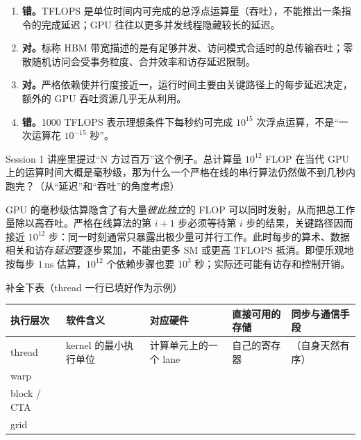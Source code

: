 \documentclass[11pt,a4paper,fontset=none]{ctexart}
\begin{document}
\begin{answer}
\begin{enumerate}[label=(\alph*)]
  \item \textbf{错。}TFLOPS 是单位时间内可完成的总浮点运算量（吞吐），不能推出一条指令的完成延迟；GPU 往往以更多并发线程隐藏较长的延迟。
  \item \textbf{对。}标称 HBM 带宽描述的是有足够并发、访问模式合适时的总传输吞吐；零散随机访问会受事务粒度、合并效率和访存延迟限制。
  \item \textbf{对。}严格依赖使并行度接近一，运行时间主要由关键路径上的每步延迟决定，额外的 GPU 吞吐资源几乎无从利用。
  \item \textbf{错。}1000 TFLOPS 表示理想条件下每秒约可完成 $10^{15}$ 次浮点运算，不是“一次运算花 $10^{-15}$ 秒”。
\end{enumerate}
\end{answer}

Session 1 讲座里提过“N 方过百万”这个例子。总计算量 $10^{12}$ FLOP 在当代 GPU 上的运算时间大概是毫秒级，那为什么一个严格在线的串行算法仍然做不到几秒内跑完？（从“延迟”和“吞吐”的角度考虑）

\begin{answer}
GPU 的毫秒级估算隐含了有大量\emph{彼此独立}的 FLOP 可以同时发射，从而把总工作量除以高吞吐。严格在线算法的第 $i+1$ 步必须等待第 $i$ 步的结果，关键路径因而接近 $10^{12}$ 步：同一时刻通常只暴露出极少量可并行工作。此时每步的算术、数据相关和访存\emph{延迟}要逐步累加，不能由更多 SM 或更高 TFLOPS 抵消。即便乐观地按每步 $1\,\mathrm{ns}$ 估算，$10^{12}$ 个依赖步骤也要 $10^3$ 秒；实际还可能有访存和控制开销。
\end{answer}

补全下表（thread 一行已填好作为示例）

\begin{center}\small
\begin{tabular}{@{}p{5.2em}p{9em}p{7.5em}p{7.5em}p{8em}@{}}
\toprule
执行层次 & 软件含义 & 对应硬件 & 直接可用的存储 & 同步与通信手段 \\
\midrule
thread & kernel 的最小执行单位 & 计算单元上的一个 lane & 自己的寄存器 & （自身天然有序） \\
warp &  &  &  &  \\
block / CTA &  &  &  &  \\
grid &  &  &  &  \\
\bottomrule
\end{tabular}
\end{center}
\end{document}
